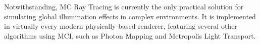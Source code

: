 Notwithstanding, MC Ray Tracing is currently the only practical solution for simulating global illumination effects in complex environments. It is implemented in virtually every modern physically-based renderer, featuring several other algorithms using MCI, such as Photon Mapping and Metropolis Light Transport.
